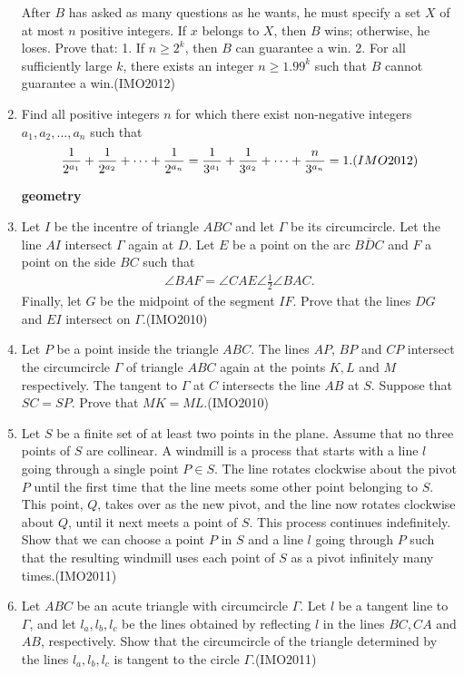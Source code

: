 \begin{enumerate}
				After $B$ has asked as many questions as he wants, he must specify a set $X$ of at most $n$ positive integers. If $x$ belongs to $X$, then $B$ wins; otherwise, he loses. Prove that:
				1. If $n\geq{2^{k}}$, then $B$ can guarantee a win.
				2. For all sufficiently large $k$, there exists an integer $n\geq{1.99^{k}}$ such that $B$ cannot guarantee a win.\hfill(IMO2012)
			\item  Find all positive integers $n$ for which there exist non-negative integers $a_{1}, a_{2}, \dots, a_{n}$ such that
				\begin{align}
					\frac{1}{2^{a_{1}}}+\frac{1}{2^{a_{2}}}+ \dots +\frac{1}{2^{a_{n}}}=\frac{1}{3^{a_{1}}}+\frac{1}{3^{a_{2}}}+ \dots +\frac{n}{3^{a_{n}}}=1.\hfill(IMO2012)
				\end{align}

				\textbf{geometry}
			\item Let $I$ be the incentre of triangle $ABC$ and let $\Gamma$ be its circumcircle. Let the line $AI$ intersect $\Gamma$ again at $D$. Let $E$ be a point on the arc $\overline{BDC}$ and $F$ a point on the side $BC$ such that
				\begin{align}
					\angle{BAF} = \angle{CAE}\angle\frac{1}{2}\angle{BAC}.
				\end{align}
				Finally, let $G$ be the midpoint of the segment $IF$. Prove that the lines $DG$ and $EI$ intersect on $\Gamma$.\hfill(IMO2010)
			\item Let $P$ be a point inside the triangle $ABC$. The lines $AP$, $BP$ and $CP$ intersect the circumcircle $\Gamma$ of triangle $ABC$ again at the points $K,L$ and $M$ respectively. The tangent to $\Gamma$ at $C$ intersects the line $AB$ at $S$. Suppose that $SC=SP$. Prove that $MK=ML$.\hfill(IMO2010)
			\item Let $S$ be a finite set of at least two points in the plane. Assume that no three points of $S$ are collinear. A windmill is a process that starts with a line $l$ going through a single point $P \in S$. The line rotates clockwise about the pivot $P$ until the first time that the line meets some other point belonging to $S$. This point, $Q$, takes over as the new pivot, and the line now rotates clockwise about $Q$, until it next meets a point of $S$. This process continues indefinitely.
				Show that we can choose a point $P$ in $S$ and a line $l$ going through $P$ such that the resulting windmill uses each point of $S$ as a pivot infinitely many times.\hfill(IMO2011)
			\item Let $ABC$ be an acute triangle with circumcircle $\Gamma$. Let $l$ be a tangent line to $\Gamma$, and let $l_{a}, l_{b}, l_{c}$ be the lines obtained by reflecting $l$ in the lines $BC, CA$ and $AB$, respectively. Show that the circumcircle of the triangle determined by the lines $l_{a}, l_{b}, l_{c}$ is tangent to the circle $\Gamma$.\hfill(IMO2011)

\end{enumerate}
